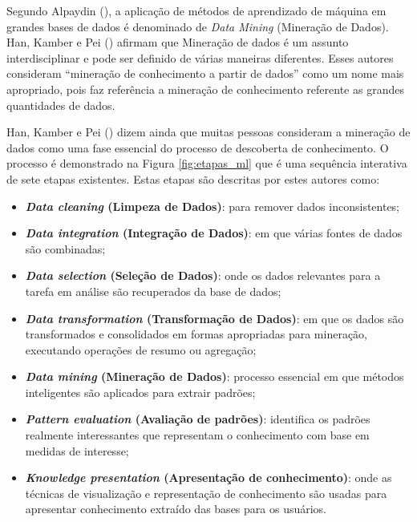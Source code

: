 Segundo Alpaydin (\citeyear{Alpaydin:2010:IML:1734076}), a aplicação de métodos de aprendizado de máquina em grandes bases de dados é denominado de \textit{Data Mining} (Mineração de Dados). Han, Kamber e Pei (\citeyear{Han:2011:DMC:1972541}) afirmam que Mineração de dados é um assunto interdisciplinar e pode ser definido de várias maneiras diferentes. Esses autores consideram “mineração de conhecimento a partir de dados'' como um nome mais apropriado, pois faz referência a mineração de conhecimento referente as grandes quantidades de dados.

Han, Kamber e Pei (\citeyear{Han:2011:DMC:1972541}) dizem ainda que muitas pessoas consideram a mineração de dados como uma fase essencial do processo de descoberta de conhecimento. O processo é demonstrado na Figura \ref{fig:etapas_ml} que é uma sequência interativa de sete etapas existentes. Estas etapas são descritas por estes autores como:

\begin{itemize}
    \item \textbf{\textit{Data cleaning} (Limpeza de Dados)}: para remover dados inconsistentes;

    \item \textbf{\textit{Data integration} (Integração de Dados)}: em que várias fontes de dados são combinadas;

    \item \textbf{\textit{Data selection} (Seleção de Dados)}: onde os dados relevantes para a tarefa em análise são recuperados da base de dados;

    \item \textbf{\textit{Data transformation} (Transformação de Dados)}: em que os dados são transformados e consolidados em formas apropriadas para mineração, executando operações de resumo ou agregação;

    \item \textbf{\textit{Data mining} (Mineração de Dados)}: processo essencial em que métodos inteligentes são aplicados para extrair padrões;

    \item \textbf{\textit{Pattern evaluation} (Avaliação de padrões)}: identifica os padrões realmente interessantes que representam o conhecimento com base em medidas de interesse;

    \item \textbf{\textit{Knowledge presentation} (Apresentação de conhecimento)}: onde as técnicas de visualização e representação de conhecimento são usadas para apresentar conhecimento extraído das bases para os usuários.

\end{itemize}

